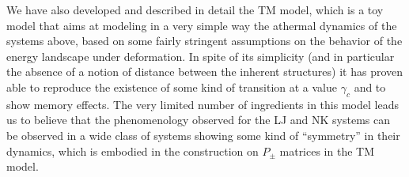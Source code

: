We have also developed and described in detail the TM model, which is a toy model that aims at modeling in a very simple way the athermal dynamics of the systems above, based on some fairly stringent assumptions on the behavior of the energy landscape under deformation. In spite of its simplicity (and in particular the absence of a notion of distance between the inherent structures) it has proven able to reproduce the existence of some kind of transition at a value $\gamma_{c}$ and to show memory effects. The very limited number of ingredients in this model leads us to believe that the phenomenology observed for the LJ and NK systems can be observed in a wide class of systems showing some kind of ``symmetry'' in their dynamics, which is embodied in the construction on $P_{\pm}$ matrices in the TM model.
